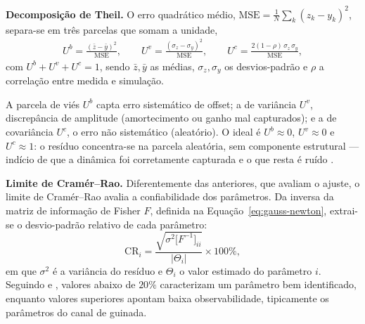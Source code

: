 \textbf{Decomposição de Theil.} O erro quadrático médio, $\mathrm{MSE}=\tfrac{1}{N}\sum_k (z_k-y_k)^2$, separa-se em três parcelas que somam a unidade,
\begin{align}
U^{b} = \frac{(\bar{z}-\bar{y})^2}{\mathrm{MSE}}, \qquad
U^{v} = \frac{(\sigma_z-\sigma_y)^2}{\mathrm{MSE}}, \qquad
U^{c} = \frac{2(1-\rho)\,\sigma_z\,\sigma_y}{\mathrm{MSE}},
\label{eq:theil}
\end{align}
com $U^{b}+U^{v}+U^{c}=1$, sendo $\bar{z},\bar{y}$ as médias, $\sigma_z,\sigma_y$ os desvios-padrão e $\rho$ a correlação entre medida e simulação. 

A parcela de viés $U^{b}$ capta erro sistemático de offset; a de variância $U^{v}$, discrepância de amplitude (amortecimento ou ganho mal capturados); e a de covariância $U^{c}$, o erro não sistemático (aleatório). O ideal é $U^{b}\approx 0$, $U^{v}\approx 0$ e $U^{c}\approx 1$: o resíduo concentra-se na parcela aleatória, sem componente estrutural --- indício de que a dinâmica foi corretamente capturada e o que resta é ruído \cite{Jategaonkar2015}.

\textbf{Limite de Cramér--Rao.} Diferentemente das anteriores, que avaliam o ajuste, o limite de Cramér--Rao avalia a confiabilidade dos parâmetros. {\color{blue}Da inversa da matriz de informação de Fisher $F$, definida na Equação~\eqref{eq:gauss-newton}, extrai-se o desvio-padrão relativo de cada parâmetro:
\begin{equation}
\mathrm{CR}_i = \frac{\sqrt{\sigma^2\big[F^{-1}\big]_{ii}}}{|\Theta_i|} \times 100\%,
\label{eq:cr}
\end{equation}
em que $\sigma^2$ é a variância do resíduo e $\Theta_i$ o valor estimado do parâmetro $i$.} Seguindo \textcite{Tischler2012} e \textcite{Sato2021}, valores abaixo de $20\%$ caracterizam um parâmetro bem identificado, enquanto valores superiores apontam baixa observabilidade, tipicamente os parâmetros do canal de guinada.
